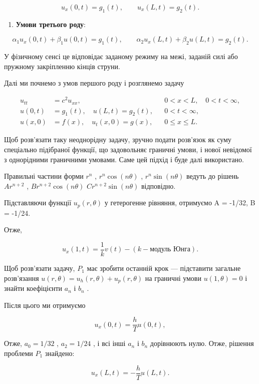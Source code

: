 \documentclass[
  ukrainian,
]{article}
\providecommand{\tightlist}{%
  \setlength{\itemsep}{0pt}\setlength{\parskip}{0pt}}
\begin{document}
\[
u_x(0,t)=g_1(t), \qquad u_x(L,t)=g_2(t).
\]

\begin{enumerate}
\def\labelenumi{\arabic{enumi}.}
\setcounter{enumi}{2}
\tightlist
\item
  \textbf{Умови третього роду}:
\end{enumerate}

\[
\alpha_1 u_x(0,t)+\beta_1 u(0,t)=g_1(t), \qquad
\alpha_2 u_x(L,t)+\beta_2 u(L,t)=g_2(t).
\]

У фізичному сенсі це відповідає заданому режиму на межі, заданій силі
або пружному закріпленню кінців струни.

Далі ми почнемо з умов першого роду і розглянемо задачу

\[
\begin{aligned}
u_{tt} &= c^2u_{xx}, && 0 < x < L,\quad 0 < t < \infty, \\
u(0,t) &= g_1(t), \quad u(L,t) = g_2(t), && 0 < t < \infty, \\
u(x,0) &= f(x), \quad u_t(x,0) = g(x), && 0 \leqslant x \leqslant L.
\end{aligned}
\]

Щоб розв'язати таку неоднорідну задачу, зручно подати розв'язок як суму
спеціально підібраної функції, що задовольняє граничні умови, і нової
невідомої з однорідними граничними умовами. Саме цей підхід і буде далі
використано.

Правильні частини форми \(r^n\) , \(r^n \cos{(n\theta)}\) ,
\(r^n \sin{(n\theta)}\) ведуть до рішень \(Ar^{n+2}\) ,
\(Br^{n+2} \cos{(n\theta)}\) \(Cr^{n+2} \sin{(n\theta)}\) відповідно.

Підставляючи функції \(u_p(r, \theta)\) у гетерогенне рівняння,
отримуємо A = -1/32, B = -1/24.

Отже,

\[
u_{x}(1, t) = \frac{1}{k} v(t) - (k - \text{модуль Юнга}).
\]

Щоб розв'язати задачу, \(P_1\) має зробити останній крок --- підставити
загальне розв'язання \(u(r, \theta) = u_h(r, \theta) + u_p(r, \theta)\)
на граничні умови \(u(1, \theta) = 0\) і знайти коефіцієнти \(a_n\) і
\(b_n\) .

Після цього ми отримуємо

\[
u_{x}(0, t) = \frac{h}{T} u(0, t),
\]

Отже, \(a_0=1/32\) , \(a_2=1/24\) , і всі інші \(a_n\) і \(b_n\)
дорівнюють нулю. Отже, рішення проблеми \(P_1\) знайдено:

\[
u_{x}(L, t) = -\frac{h}{T} u(L, t).
\]
\end{document}
